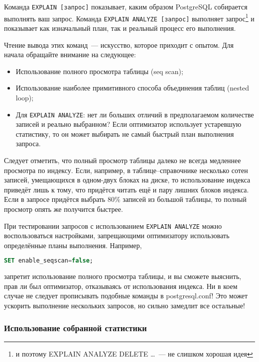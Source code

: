 Команда \lstinline!EXPLAIN [запрос]! показывает, каким образом PostgreSQL собирается выполнять ваш запрос. Команда \lstinline!EXPLAIN ANALYZE [запрос]! выполняет запрос\footnote{и поэтому EXPLAIN ANALYZE DELETE \dots~--- не слишком хорошая идея} и показывает как изначальный план, так и реальный процесс его выполнения.

Чтение вывода этих команд~--- искусство, которое приходит с опытом. Для начала обращайте внимание на следующее:

\begin{itemize}
  \item Использование полного просмотра таблицы (seq scan);
  \item Использование наиболее примитивного способа объединения таблиц (nested loop);
  \item Для \lstinline!EXPLAIN ANALYZE!: нет ли больших отличий в предполагаемом количестве записей и реально выбранном? Если оптимизатор использует устаревшую статистику, то он может выбирать не самый быстрый план выполнения запроса.
\end{itemize}

Следует отметить, что полный просмотр таблицы далеко не всегда медленнее просмотра по индексу. Если, например, в таблице--справочнике несколько сотен записей, умещающихся в одном-двух блоках на диске, то использование индекса приведёт лишь к тому, что придётся читать ещё и пару лишних блоков индекса. Если в запросе придётся выбрать 80\% записей из большой таблицы, то полный просмотр опять же получится быстрее.

При тестировании запросов с использованием \lstinline!EXPLAIN ANALYZE! можно воспользоваться настройками, запрещающими оптимизатору использовать определённые планы выполнения. Например,

\begin{lstlisting}[language=SQL,label=lst:summary-explain1,caption=enable\_seqscan]
SET enable_seqscan=false;
\end{lstlisting}

запретит использование полного просмотра таблицы, и вы сможете выяснить, прав ли был оптимизатор, отказываясь от использования индекса. Ни в коем случае не следует прописывать подобные команды в postgresql.conf! Это может ускорить выполнение нескольких запросов, но сильно замедлит все остальные!


\subsubsection{Использование собранной статистики}

